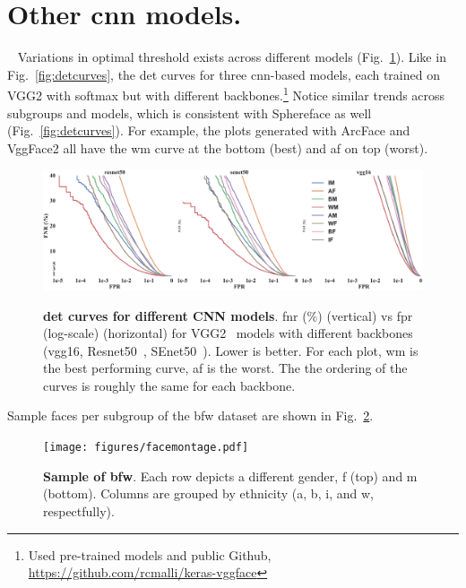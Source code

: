 %
\onecolumn
\renewcommand{\thesection}{\alph{section}}
\glsresetall
\setcounter{section}{0}

\section{Other \gls{cnn} models.}~\label{app:sec:other:models}
Variations in optimal threshold exists across different models (Fig.~\ref{fig:sdm-appendix-a}). Like in Fig.~\ref{fig:detcurves}, the \gls{det} curves for three \gls{cnn}-based models, each trained on VGG2 with softmax but with different backbones.\footnote{Used pre-trained models and public Github, \href{https://github.com/rcmalli/keras-vggface}{https://github.com/rcmalli/keras-vggface}} Notice similar trends across subgroups and models, which is consistent with  Sphereface as well (Fig.~\ref{fig:detcurves}). For example, the plots generated with ArcFace and VggFace2 all have the \gls{wm} curve at the bottom (\ie best) and \gls{af} on top (\ie worst).
\begin{figure}[h!]
\vspace{-2mm}
    \centering
    \includegraphics[width=.8\linewidth, trim={0mm 0mm 0mm 0mm},clip]{figures/SDM.pdf}\\
    \caption{\textbf{\gls{det} curves for different CNN models}. \gls{fnr} (\%) (vertical) vs \gls{fpr} (log-scale)  (horizontal) for VGG2~\cite{Cao18} models with different backbones (vgg16, Resnet50~\cite{he2016deep}, SEnet50~\cite{hu2018squeeze}). Lower is better. For each plot, \gls{wm} is the best performing curve, \gls{af} is the worst. The the ordering of the curves is roughly the same for each backbone.}\label{fig:sdm-appendix-a}
    \vspace{-3mm}
\end{figure}

Sample faces per subgroup of the \gls{bfw} dataset are shown in Fig.~\ref{fig:montage:app}.
\begin{figure}[h!]
\vspace{-2mm}
    \centering
    \texttt{[image: figures/facemontage.pdf]}
    \caption{\textbf{Sample of \gls{bfw}}. Each row depicts a different gender, \gls{f} (top) and \gls{m} (bottom). Columns are grouped by ethnicity (\ie \gls{a}, \gls{b}, \gls{i}, and \gls{w}, respectfully).}
    \label{fig:montage:app}
    \vspace{-3mm}
\end{figure}


